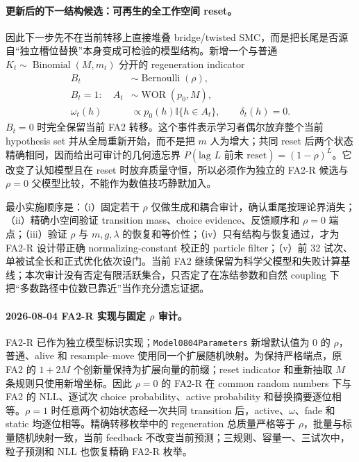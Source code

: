 \paragraph{更新后的下一结构候选：可再生的全工作空间 reset。}
因此下一步先不在当前转移上直接堆叠 bridge/twisted SMC，而是把长尾是否源自“独立槽位替换”本身变成可检验的模型结构。新增一个与普通 $K_t\sim\operatorname{Binomial}(M,m_t)$ 分开的 regeneration indicator
\begin{equation}
 \begin{aligned}
 B_t&\sim\operatorname{Bernoulli}(\rho),\\
 B_t=1:\quad
 A_t&\sim\operatorname{WOR}(p_0,M),\\
 \omega_t(h)&\propto p_0(h)\mathbb I\{h\in A_t\},
 \qquad \delta_t(h)=0.
 \end{aligned}
 \label{eq:model0804-regeneration}
\end{equation}
$B_t=0$ 时完全保留当前 FA2 转移。这个事件表示学习者偶尔放弃整个当前 hypothesis set 并从全局重新开始，而不是把 $m$ 人为增大；共同 reset 后两个状态精确相同，因而给出可审计的几何遗忘界 $P(\text{lag }L\text{ 前未 reset})=(1-\rho)^L$。它改变了认知模型且在 reset 时放弃质量守恒，所以必须作为独立的 FA2-R 候选与 $\rho=0$ 父模型比较，不能作为数值技巧静默加入。

最小实施顺序是：（i）固定若干 $\rho$ 仅做生成和耦合审计，确认重尾按理论界消失；（ii）精确小空间验证 transition mass、choice evidence、反馈顺序和 $\rho=0$ 端点；（iii）验证 $\rho$ 与 $m,g,\lambda$ 的恢复和等价性；（iv）只有结构与恢复通过，才为 FA2-R 设计带正确 normalizing-constant 校正的 particle filter；（v）前 32 试次、单被试全长和正式优化依次设门。当前 FA2 继续保留为科学父模型和失败计算基线；本次审计没有否定有限活跃集合，只否定了在冻结参数和自然 coupling 下把“多数路径中位数已靠近”当作充分遗忘证据。

\paragraph{2026-08-04 FA2-R 实现与固定 $\rho$ 审计。}
FA2-R 已作为独立模型标识实现；\texttt{Model0804Parameters} 新增默认值为 0 的 $\rho$，普通、alive 和 resample--move 使用同一个扩展随机映射。为保持严格端点，原 FA2 的 $1+2M$ 个创新量保持为扩展向量的前缀；reset indicator 和重新抽取 $M$ 条规则只使用新增坐标。因此 $\rho=0$ 的 FA2-R 在 common random numbers 下与 FA2 的 NLL、逐试次 choice probability、active probability 和替换摘要逐位相等。$\rho=1$ 时任意两个初始状态经一次共同 transition 后，active、$\omega$、fade 和 static 均逐位相等。精确转移枚举中的 regeneration 总质量严格等于 $\rho$，批量与标量随机映射一致，当前 feedback 不改变当前预测；三规则、容量一、三试次中，粒子预测和 NLL 也恢复精确 FA2-R 枚举。

